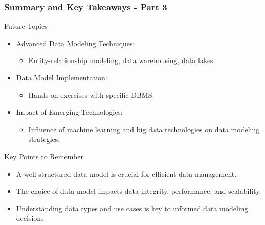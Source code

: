 \documentclass[aspectratio=169]{beamer}
\begin{document}
\begin{frame}[fragile]
    \frametitle{Summary and Key Takeaways - Part 3}
    \begin{block}{Future Topics}
        \begin{itemize}
            \item Advanced Data Modeling Techniques:
            \begin{itemize}
                \item Entity-relationship modeling, data warehousing, data lakes.
            \end{itemize}
            \item Data Model Implementation:
            \begin{itemize}
                \item Hands-on exercises with specific DBMS.
            \end{itemize}
            \item Impact of Emerging Technologies:
            \begin{itemize}
                \item Influence of machine learning and big data technologies on data modeling strategies.
            \end{itemize}
        \end{itemize}
    \end{block}
    
    \begin{block}{Key Points to Remember}
        \begin{itemize}
            \item A well-structured data model is crucial for efficient data management.
            \item The choice of data model impacts data integrity, performance, and scalability.
            \item Understanding data types and use cases is key to informed data modeling decisions.
        \end{itemize}
    \end{block}
\end{frame}
\end{document}
